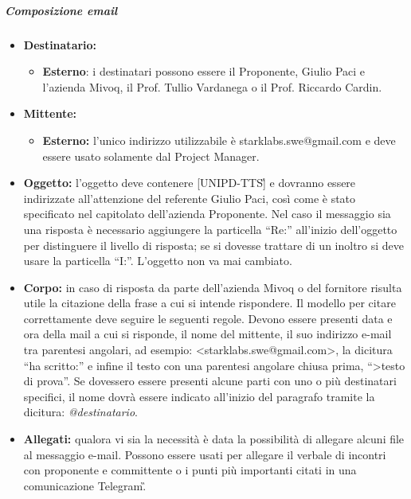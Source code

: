 \subparagraph{Composizione email}
\begin{itemize}
\item \textbf{Destinatario:}
\begin{itemize}
\item \textbf{Esterno}: i destinatari possono essere il Proponente, Giulio 
	Paci e l'azienda Mivoq, il Prof. Tullio Vardanega o il Prof. Riccardo 
	Cardin.
\end{itemize}
\item \textbf{Mittente:}
\begin{itemize}
\item \textbf{Esterno:} l'unico indirizzo utilizzabile è 
	starklabs.swe@gmail.com e deve essere usato solamente dal Project Manager.
\end{itemize}

\item \textbf{Oggetto:} l'oggetto deve contenere [UNIPD-TTS\G] e dovranno essere indirizzate 
all'attenzione del referente Giulio Paci, così come è stato specificato nel 
capitolato dell'azienda Proponente. Nel caso il messaggio sia una risposta è 
necessario aggiungere la particella “Re:” all'inizio dell'oggetto per 
distinguere il livello di risposta; se si dovesse trattare di un inoltro si 
deve usare la particella “I:”. L'oggetto non va mai cambiato.

\item \textbf{Corpo:} in caso di risposta da parte dell'azienda Mivoq o del fornitore
risulta utile la citazione della frase a cui si intende rispondere. Il modello 
per citare correttamente deve seguire le seguenti regole. Devono essere 
presenti data e ora della mail a cui si risponde, il nome del mittente, il suo 
indirizzo e-mail tra parentesi angolari, ad esempio: <starklabs.swe@gmail.com>, 
la dicitura “ha scritto:” e infine il testo con una parentesi angolare chiusa 
prima, “>testo di prova”. Se dovessero essere presenti alcune parti con uno o 
più destinatari specifici, il nome dovrà essere indicato all'inizio del 
paragrafo tramite la dicitura: \textit{@destinatario}.

\item \textbf{Allegati:} qualora vi sia la necessità è data la possibilità di allegare alcuni file al 
messaggio e-mail. Possono essere usati per allegare il verbale di incontri con 
proponente e committente o i punti più importanti citati in una comunicazione 
Telegram\G.

\end{itemize}


